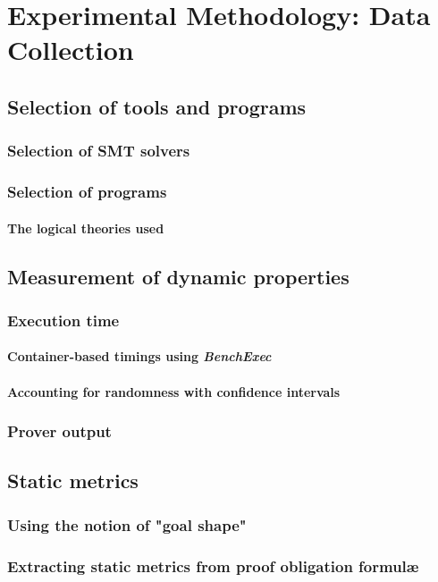 \chapter{Experimental Methodology: Data Collection}%

\label{Experimental} %


\section{Selection of tools and programs}
\subsection{Selection of \textsc{SMT} solvers}
\subsection{Selection of \why{} programs}
\subsubsection{The logical theories used}

\section{Measurement of dynamic properties}
\subsection{Execution time}
\subsubsection{Container-based timings using \textit{BenchExec}}
\subsubsection{Accounting for randomness with confidence intervals}
\subsection{Prover output}

\section{Static metrics}
\subsection{Using the \why{} notion of "goal shape"}
\subsection{Extracting static metrics from \why{} proof obligation formul\ae}



